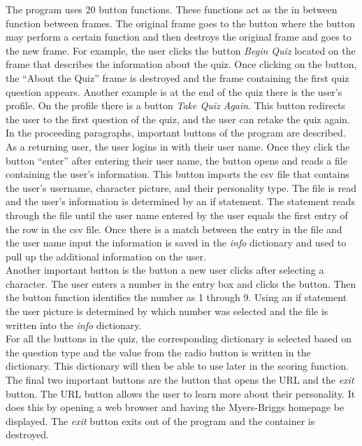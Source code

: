 \documentclass[11pt]{article}%
\begin{document}
\indent The program uses 20 button functions. These functions act as the in between function between frames. The original frame goes to the button where the button may perform a certain function and then destroys the original frame and goes to the new frame. For example, the user clicks the button \textit{Begin Quiz} located on the frame that describes the information about the quiz. Once clicking on the button, the “About the Quiz” frame is destroyed and the frame containing the first quiz question appears. Another example is at the end of the quiz there is the user’s profile. On the profile there is a button \textit{Take Quiz Again}. This button redirects the user to the first question of the quiz, and the user can retake the quiz again. In the proceeding paragraphs, important buttons of the program are described.\\
\indent As a returning user, the user logins in with their user name. Once they click the button “enter” after entering their user name, the button opens and reads a file containing the user’s information. This button imports the csv file that contains the user’s username, character picture, and their personality type. The file is read and the user's information is determined by an if statement. The statement reads through the file until the user name entered by the user equals the first entry of the row in the csv file. Once there is a match between the entry in the file and the user name input the information is saved in the \textit{info} dictionary and used to pull up the additional information on the user.\\
\indent Another important button is the button a new user clicks after selecting a character. The user enters a number in the entry box and clicks the button. Then the button function identifies the number as 1 through 9. Using an if statement the user picture is determined by which number was selected and the file is written into the \textit{info} dictionary.\\
\indent For all the buttons in the quiz, the corresponding dictionary is selected based on the question type and the value from the radio button is written in the dictionary. This dictionary will then be able to use later in the scoring function.\\
\indent The final two important buttons are the button that opens the URL and the \textit{exit} button. The URL button allows the user to learn more about their personality. It does this by opening a web browser and having the Myers-Briggs homepage be displayed. The \textit{exit} button exits out of the program and the container is destroyed.\\
\end{document}
